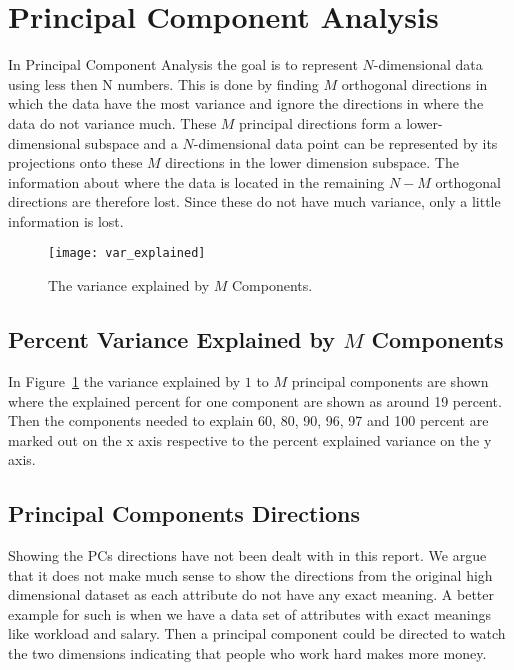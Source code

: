 \section{Principal Component Analysis}

In Principal Component Analysis the goal is to represent $N$-dimensional data using less then N numbers. This is done by finding $M$ orthogonal directions in which the data have the most variance and ignore the directions in where the data do not variance much. These $M$ principal directions form a lower-dimensional subspace and a $N$-dimensional data point can be represented by its projections onto these $M$ directions in the lower dimension subspace. The information about where the data is located in the remaining $N-M$ orthogonal directions are therefore lost. Since these do not have much variance, only a little information is lost.

\begin{figure}[H]
\centering
\texttt{[image: var\_explained]}
\caption{The variance explained by $M$ Components.\label{fig:pca_var_explained}}
\end{figure}

\subsection{Percent Variance Explained by $M$ Components}

In Figure~\ref{fig:pca_var_explained} the variance explained by $1$ to $M$ principal components are shown where the explained percent for one component are shown as around 19 percent. Then the components needed to explain 60, 80, 90, 96, 97 and 100 percent are marked out on the x axis respective to the percent explained variance on the y axis.

\subsection{Principal Components Directions}
Showing the PCs directions have not been dealt with in this report. We argue that it does not make much sense to show the directions from the original high dimensional dataset as each attribute do not have any exact meaning. A better example for such is when we have a data set of attributes with exact meanings like workload and salary. Then a principal component could be directed to watch the two dimensions indicating that people who work hard makes more money.


